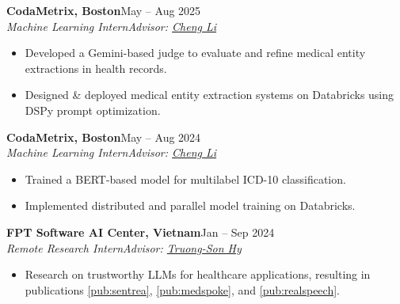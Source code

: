 \documentclass[11pt,a4paper]{article}
\newcommand{\role}[4]{\textbf{#1}\hfill #2\\\textit{#3}\hfill\textit{#4}\par}
\begin{document}
\role{CodaMetrix, Boston}{May -- Aug 2025}{Machine Learning Intern}{Advisor: \href{https://www.chengli.io/}{Cheng Li}}
\vspace{-5pt}
\begin{itemize}[itemsep=1pt,parsep=0pt]
\item Developed a Gemini-based judge to evaluate and refine medical entity extractions in health records.
\item Designed \& deployed medical entity extraction systems on Databricks using DSPy prompt optimization.
\end{itemize}
\role{CodaMetrix, Boston}{May -- Aug 2024}{Machine Learning Intern}{Advisor: \href{https://www.chengli.io/}{Cheng Li}}
\vspace{-5pt}
\begin{itemize} [itemsep=1pt,parsep=0pt]
\item Trained a BERT-based model for multilabel ICD-10 classification.
\item Implemented distributed and parallel model training on Databricks.
\end{itemize}
\role{FPT Software AI Center, Vietnam}{Jan -- Sep 2024}{Remote Research Intern}{Advisor:  \href{https://scholar.google.com/citations?user=JiKBo6UAAAAJ&hl=en}{Truong-Son Hy}}
\vspace{-5pt}
\begin{itemize}
\item Research on trustworthy LLMs for healthcare applications, resulting in publications  \ref{pub:sentrea}, \ref{pub:medspoke}, and \ref{pub:realspeech}.
\end{itemize}
\end{document}
